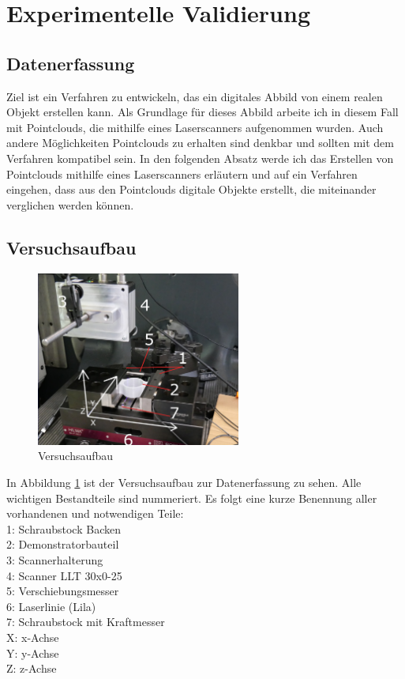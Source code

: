 \documentclass[../main.tex]{subfiles}
\begin{document}
\section{Experimentelle Validierung}

\subsection{Datenerfassung}
Ziel ist ein Verfahren zu entwickeln, das ein digitales Abbild von einem realen Objekt
erstellen kann.
Als Grundlage für dieses Abbild arbeite ich in diesem Fall mit Pointclouds, 
die mithilfe eines Laserscanners aufgenommen wurden. Auch andere Möglichkeiten
Pointclouds zu erhalten sind denkbar und sollten mit dem Verfahren 
kompatibel sein. In den folgenden Absatz werde ich das Erstellen von Pointclouds 
mithilfe eines Laserscanners erläutern und auf ein Verfahren eingehen, dass aus 
den Pointclouds digitale Objekte erstellt, die miteinander verglichen werden können.

\subsection{Versuchsaufbau}

\begin{figure}
    \includegraphics[width=0.6\textwidth]{images/versuchsaufbau_foto.png.JPG}
    \caption{Versuchsaufbau}
    \label{fig:versuchsaufbau}
\end{figure}

In Abbildung \ref{fig:versuchsaufbau} ist der Versuchsaufbau zur Datenerfassung 
zu sehen. Alle wichtigen Bestandteile sind nummeriert. Es folgt eine kurze Benennung
aller vorhandenen und notwendigen Teile:\\
1: Schraubstock Backen\\
2: Demonstratorbauteil\\
3: Scannerhalterung\\
4: Scanner LLT 30x0-25\\
5: Verschiebungsmesser\\
6: Laserlinie (Lila)\\
7: Schraubstock mit Kraftmesser\\
X: x-Achse\\
Y: y-Achse\\
Z: z-Achse\\
\end{document}
